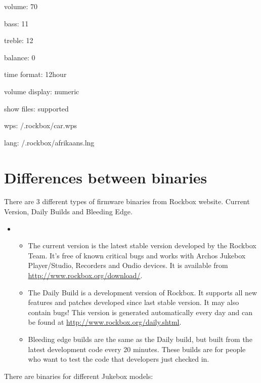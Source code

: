 volume: 70

bass: 11

treble: 12

balance: 0

time format: 12hour

volume display: numeric

show files: supported

wps: /.rockbox/car.wps

lang: /.rockbox/afrikaans.lng

\section{\label{ref:PartISection1}Differences between binaries}
There are 3 different types of firmware binaries from Rockbox website. Current Version, Daily Builds and Bleeding Edge.

\begin{itemize}
\item \begin{itemize}
\item The current version is the latest stable version developed by the
Rockbox Team. It's free of known critical bugs and works with Archos
Jukebox Player/Studio, Recorders and Ondio devices.  It is available
from 
\url{http://www.rockbox.org/download/}.
\item The Daily Build is a development version of Rockbox. It supports all new features and patches developed since last stable version. It may also contain bugs! This version is generated automatically every day and can be found at
\url{http://www.rockbox.org/daily.shtml}.
\item Bleeding edge builds are the same as the Daily build, but built
from the latest development code every 20 minutes. These builds are for
people who want to test the code that developers just checked in.
\end{itemize}
\end{itemize}
There are binaries for different Jukebox models: 

